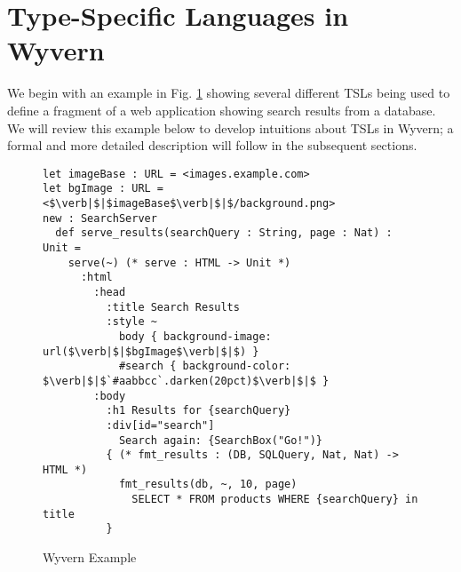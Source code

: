 
\section{Type-Specific Languages in Wyvern}
\label{s:motivation}
We begin with an example in Fig. \ref{f-example} showing several different TSLs being used to define a fragment of a web application showing search results from a database. We will review this example below to develop intuitions about TSLs in Wyvern; a formal and more detailed description will follow in the subsequent sections.
\begin{figure}[t]
\begin{lstlisting}
let imageBase : URL = <images.example.com>
let bgImage : URL = <$\verb|$|$imageBase$\verb|$|$/background.png>
new : SearchServer
  def serve_results(searchQuery : String, page : Nat) : Unit =
    serve(~) (* serve : HTML -> Unit *)
      :html
        :head
          :title Search Results
          :style ~
            body { background-image: url($\verb|$|$bgImage$\verb|$|$) }
            #search { background-color: $\verb|$|$`#aabbcc`.darken(20pct)$\verb|$|$ }
        :body
          :h1 Results for {searchQuery}
          :div[id="search"]
            Search again: {SearchBox("Go!")}
          { (* fmt_results : (DB, SQLQuery, Nat, Nat) -> HTML *)
            fmt_results(db, ~, 10, page)
              SELECT * FROM products WHERE {searchQuery} in title
          }
\end{lstlisting}
\vspace{-8px}
\caption{Wyvern Example }
\label{f-example}
\vspace{-10px}
\end{figure}
